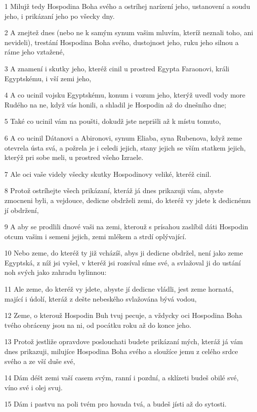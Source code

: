 \par 1 Milujž tedy Hospodina Boha svého a ostríhej narízení jeho, ustanovení a soudu jeho, i prikázaní jeho po všecky dny.
\par 2 A znejtež dnes (nebo ne k samým synum vašim mluvím, kteríž neznali toho, ani nevideli), trestání Hospodina Boha svého, dustojnost jeho, ruku jeho silnou a ráme jeho vztažené,
\par 3 A znamení i skutky jeho, kteréž cinil u prostred Egypta Faraonovi, králi Egyptskému, i vší zemi jeho,
\par 4 A co ucinil vojsku Egyptskému, konum i vozum jeho, kterýž uvedl vody more Rudého na ne, když vás honili, a shladil je Hospodin až do dnešního dne;
\par 5 Také co ucinil vám na poušti, dokudž jste neprišli až k místu tomuto,
\par 6 A co ucinil Dátanovi a Abironovi, synum Eliaba, syna Rubenova, když zeme otevrela ústa svá, a požrela je i celedi jejich, stany jejich se vším statkem jejich, kterýž pri sobe meli, u prostred všeho Izraele.
\par 7 Ale oci vaše videly všecky skutky Hospodinovy veliké, kteréž cinil.
\par 8 Protož ostríhejte všech prikázaní, kteráž já dnes prikazuji vám, abyste zmocneni byli, a vejdouce, dedicne obdrželi zemi, do kteréž vy jdete k dedicnému jí obdržení,
\par 9 A aby se prodlili dnové vaši na zemi, kterouž s prísahou zaslíbil dáti Hospodin otcum vašim i semeni jejich, zemi mlékem a strdí oplývající.
\par 10 Nebo zeme, do kteréž ty již vcházíš, abys ji dedicne obdržel, není jako zeme Egyptská, z níž jsi vyšel, v kteréž jsi rozsíval síme své, a svlažoval ji do ustání noh svých jako zahradu bylinnou:
\par 11 Ale zeme, do kteréž vy jdete, abyste jí dedicne vládli, jest zeme hornatá, mající i údolí, kteráž z dešte nebeského svlažována bývá vodou,
\par 12 Zeme, o kterouž Hospodin Buh tvuj pecuje, a vždycky oci Hospodina Boha tvého obráceny jsou na ni, od pocátku roku až do konce jeho.
\par 13 Protož jestliže opravdove poslouchati budete prikázaní mých, kteráž já vám dnes prikazuji, milujíce Hospodina Boha svého a sloužíce jemu z celého srdce svého a ze vší duše své,
\par 14 Dám déšt zemi vaší casem svým, ranní i pozdní, a sklízeti budeš obilé své, víno své i olej svuj.
\par 15 Dám i pastvu na poli tvém pro hovada tvá, a budeš jísti až do sytosti.
